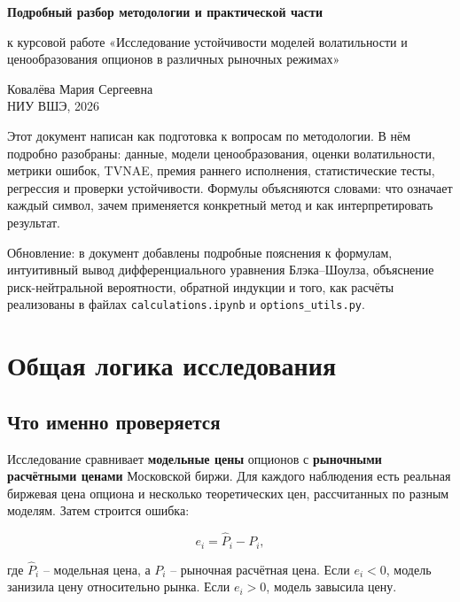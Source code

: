 \documentclass[11pt,a4paper]{article}
\begin{document}
\begin{center}
{\Large\bfseries Подробный разбор методологии и практической части\par}
\vspace{0.3em}
{\large к курсовой работе «Исследование устойчивости моделей волатильности и ценообразования опционов в различных рыночных режимах»\par}
\vspace{0.5em}
Ковалёва Мария Сергеевна \\
НИУ ВШЭ, 2026
\end{center}

\vspace{0.8em}

Этот документ написан как подготовка к вопросам по методологии. В нём подробно разобраны: данные, модели ценообразования, оценки волатильности, метрики ошибок, TVNAE, премия раннего исполнения, статистические тесты, регрессия и проверки устойчивости. Формулы объясняются словами: что означает каждый символ, зачем применяется конкретный метод и как интерпретировать результат.

Обновление: в документ добавлены подробные пояснения к формулам, интуитивный вывод дифференциального уравнения Блэка--Шоулза, объяснение риск-нейтральной вероятности, обратной индукции и того, как расчёты реализованы в файлах \texttt{calculations.ipynb} и \texttt{options\_utils.py}.

\tableofcontents
\newpage

\section{Общая логика исследования}

\subsection{Что именно проверяется}

Исследование сравнивает \textbf{модельные цены} опционов с \textbf{рыночными расчётными ценами} Московской биржи. Для каждого наблюдения есть реальная биржевая цена опциона и несколько теоретических цен, рассчитанных по разным моделям. Затем строится ошибка:

\begin{equation}
e_i = \widehat{P}_i - P_i,
\end{equation}

где $\widehat{P}_i$ -- модельная цена, а $P_i$ -- рыночная расчётная цена. Если $e_i<0$, модель занизила цену относительно рынка. Если $e_i>0$, модель завысила цену.
\end{document}
